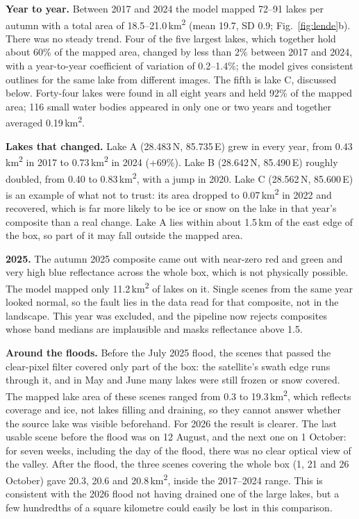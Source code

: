 \documentclass[11pt,a4paper]{article}
\newcommand{\kmsq}{\,km\textsuperscript{2}}
\begin{document}
\textbf{Year to year.} Between 2017 and 2024 the model mapped 72--91 lakes per autumn with a total area of 18.5--21.0\kmsq{} (mean 19.7, SD 0.9; Fig.~\ref{fig:lende}b). There was no steady trend. Four of the five largest lakes, which together hold about 60\% of the mapped area, changed by less than 2\% between 2017 and 2024, with a year-to-year coefficient of variation of 0.2--1.4\%; the model gives consistent outlines for the same lake from different images. The fifth is lake C, discussed below. Forty-four lakes were found in all eight years and held 92\% of the mapped area; 116 small water bodies appeared in only one or two years and together averaged 0.19\kmsq.

\textbf{Lakes that changed.} Lake A (28.483\,N, 85.735\,E) grew in every year, from 0.43\kmsq{} in 2017 to 0.73\kmsq{} in 2024 (+69\%). Lake B (28.642\,N, 85.490\,E) roughly doubled, from 0.40 to 0.83\kmsq{}, with a jump in 2020. Lake C (28.562\,N, 85.600\,E) is an example of what not to trust: its area dropped to 0.07\kmsq{} in 2022 and recovered, which is far more likely to be ice or snow on the lake in that year's composite than a real change. Lake A lies within about 1.5\,km of the east edge of the box, so part of it may fall outside the mapped area.

\textbf{2025.} The autumn 2025 composite came out with near-zero red and green and very high blue reflectance across the whole box, which is not physically possible. The model mapped only 11.2\kmsq{} of lakes on it. Single scenes from the same year looked normal, so the fault lies in the data read for that composite, not in the landscape. This year was excluded, and the pipeline now rejects composites whose band medians are implausible and masks reflectance above 1.5.

\textbf{Around the floods.} Before the July 2025 flood, the scenes that passed the clear-pixel filter covered only part of the box: the satellite's swath edge runs through it, and in May and June many lakes were still frozen or snow covered. The mapped lake area of these scenes ranged from 0.3 to 19.3\kmsq{}, which reflects coverage and ice, not lakes filling and draining, so they cannot answer whether the source lake was visible beforehand. For 2026 the result is clearer. The last usable scene before the flood was on 12 August, and the next one on 1 October: for seven weeks, including the day of the flood, there was no clear optical view of the valley. After the flood, the three scenes covering the whole box (1, 21 and 26 October) gave 20.3, 20.6 and 20.8\kmsq{}, inside the 2017--2024 range. This is consistent with the 2026 flood not having drained one of the large lakes, but a few hundredths of a square kilometre could easily be lost in this comparison.
\end{document}
